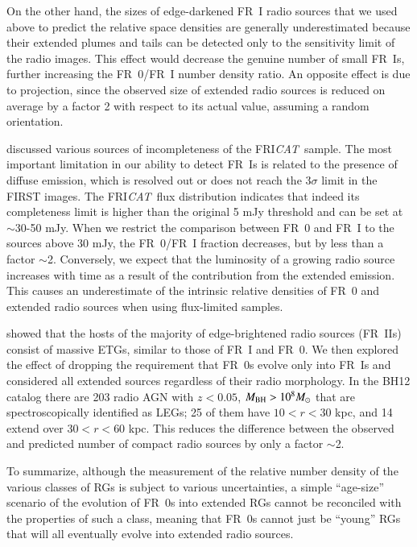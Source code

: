 \documentclass[traditabstract]{aa}
\newcommand{\FR}{FRI{\sl{CAT}}}\newcommand{\FRII}{FRII{\sl{CAT}}}
\begin{document}
On the other hand, the sizes of edge-darkened FR~I radio sources that
we used above to predict the relative space densities are generally
underestimated because their extended plumes and tails can be detected
only to the sensitivity limit of the radio images. This effect would
decrease the genuine number of small FR~Is, further increasing the
FR~0/FR~I number density ratio. An opposite effect is due to
projection, since the observed size of extended radio sources is
reduced on average by a factor 2 with respect to its actual value,
assuming a random orientation.

\citet{capetti17a} discussed various sources of incompleteness of the
\FR\ sample. The most important limitation in our ability to detect
FR~Is is related to the presence of diffuse emission, which is
resolved out or does not reach the 3$\sigma$ limit in the FIRST
images. The \FR\ flux distribution indicates that indeed its
completeness limit is higher than the original 5 mJy threshold and can
be set at $\sim$30-50 mJy. When we restrict the comparison between
FR~0 and FR~I to the sources above 30 mJy, the FR~0/FR~I fraction
decreases, but by less than a factor $\sim$2.  Conversely, we expect
that the luminosity of a growing radio source increases with time as a
result of the contribution from the extended emission.  This causes an
underestimate of the intrinsic relative densities of FR~0 and extended
radio sources when using flux-limited samples.

\citet{capetti17b} showed that the hosts of the majority of
edge-brightened radio sources (FR~IIs) consist of massive ETGs,
similar to those of FR~I and FR~0. We then explored the effect of
dropping the requirement that FR~0s evolve only into FR~Is and considered
all extended sources regardless of their radio morphology.  In the
BH12 catalog there are 203 radio AGN with $z<0.05$, $M_{\rm BH} > 10^8
M_\odot$ that are spectroscopically identified as LEGs; 25 of them have
$10 < r < 30$ kpc, and 14 extend over $30 < r < 60$ kpc. This reduces
the difference between the observed and predicted number of compact radio
sources by only a factor $\sim$2.

To summarize, although the measurement of the relative number density
of the various classes of RGs is subject to various uncertainties, a
simple ``age-size'' scenario of the evolution of FR~0s into extended
RGs cannot be reconciled with the properties of such a class, meaning
that FR~0s cannot just be ``young'' RGs that will all eventually evolve
into extended radio sources.
\end{document}
